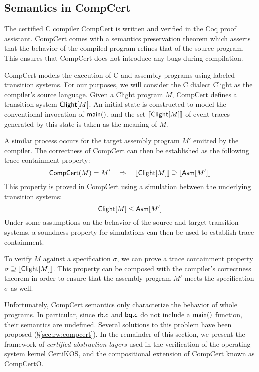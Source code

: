 \documentclass[acmsmall,review,anonymous]{acmart}\settopmatter{printfolios=true,printccs=false,printacmref=false}
\begin{document}
\subsection{Semantics in CompCert} %

The certified C compiler CompCert \cite{compcert} is
written and verified in the Coq proof assistant.
CompCert comes with a semantics preservation theorem
which asserts that
the behavior of the compiled program
refines that of the source program.
This ensures that CompCert does not introduce any bugs
during compilation.

CompCert
models the execution of C and assembly programs
using labeled transition systems.
For our purposes,
we will consider the C dialect Clight
as the compiler's source language.
Given a Clight program $M$,
CompCert defines a transition system $ \mathsf{Clight} [M]$.
An initial state is constructed
to model the conventional invocation of $ \mathsf{main} ()$,
and the set $\llbracket  \mathsf{Clight} [M] \rrbracket$ of
event traces generated by this state
is taken as the meaning of $M$.

A similar process occurs for the target assembly program $M'$
emitted by the compiler.
The correctness of CompCert can then be established
as the following trace containment property:
\[
   \mathsf{CompCert} (M) = M'
    \quad \Rightarrow \quad
  \llbracket  \mathsf{Clight} [M] \rrbracket \supseteq
            \llbracket  \mathsf{Asm} [M'] \rrbracket
\]
This property is proved in CompCert
using a simulation between the underlying transition systems:
\[
   \mathsf{Clight} [M] \le  \mathsf{Asm} [M']
\]
Under some assumptions
on the behavior of the source and target transition systems,
a soundness property for simulations
can then be used to establish trace containment.

To verify $M$ against a specification $\sigma$,
we can prove a trace containment property
$\sigma \supseteq \llbracket  \mathsf{Clight} [M] \rrbracket$.
This property can be composed with
the compiler's correctness theorem
in order to ensure that the assembly program $M'$
meets the specification $\sigma$ as well.

Unfortunately,
CompCert semantics only characterize the behavior of whole programs.
In particular,
since $ \mathsf{rb.c} $ and $ \mathsf{bq.c} $ do not include a $ \mathsf{main} ()$ function,
their semantics are undefined.
Several solutions to this problem have been proposed (\S\ref{sec:rw:compcert}).
In the remainder of this section,
we present the framework of \emph{certified abstraction layers}
used in the verification of the operating system kernel CertiKOS,
and the compositional extension of CompCert known as CompCertO.
\end{document}
